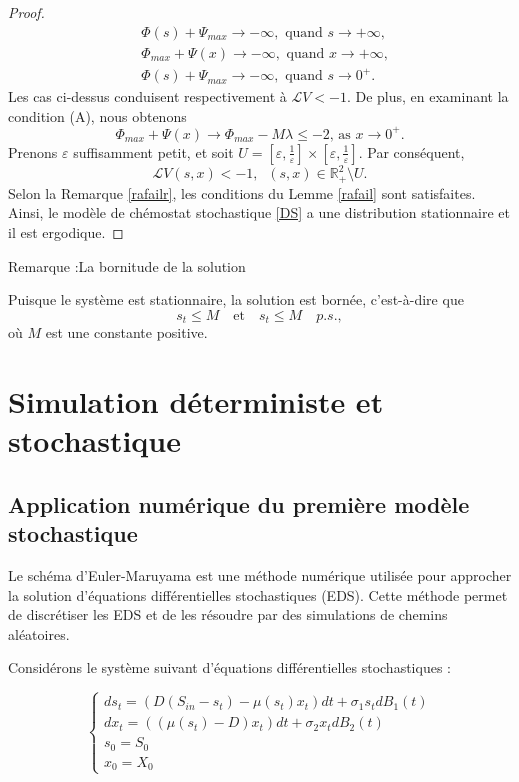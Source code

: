 \documentclass[12pt,a4paper]{report}%
\newcounter{remm}[chapter]
\newenvironment{remarque}[2][]
  {\refstepcounter{remm}
  \begin{bclogo}[
    couleur=white,
    arrondi=0.1,
    couleurBord=white,#1]{Remarque \theremm:#2}
  }
  {\end{bclogo}}
\begin{document}
\begin{proof}
$$\begin{aligned}
		& \Phi(s)+\Psi_{max} \rightarrow-\infty, \text { quand } s \rightarrow+\infty, \\
		& \Phi_{max}+\Psi(x) \rightarrow-\infty, \text { quand } x \rightarrow+\infty, \\
		& \Phi(s)+\Psi_{max} \rightarrow-\infty, \text { quand } s \rightarrow 0^{+} .
	\end{aligned}
	$$
	Les cas ci-dessus conduisent respectivement à \(\mathcal{L} V < -1\). De plus, en examinant la condition (A), nous obtenons
	$$
	\Phi_{max}+\Psi(x) \rightarrow \Phi_{max}-M \lambda \leq-2 \text {, as } x \rightarrow 0^{+} .
	$$
	Prenons \(\varepsilon\) suffisamment petit, et soit \( U = \left[\varepsilon, \frac{1}{\varepsilon}\right] \times \left[\varepsilon, \frac{1}{\varepsilon}\right] \). Par conséquent,
	$$
	\mathcal{L} V(s, x)<-1, \;\;(s, x) \in \mathbb{R}^2_+\setminus U .
	$$
	Selon la Remarque \ref{rafailr}, les conditions du Lemme \ref{rafail} sont satisfaites. Ainsi, le modèle de chémostat stochastique \eqref{DS} a une distribution stationnaire et il est ergodique.
\end{proof}
\begin{remarque}{La bornitude de la solution}
	Puisque le système est stationnaire, la solution est bornée, c'est-à-dire que 
	$$s_t \leqslant M  \quad \text{et} \quad s_t \leqslant M \quad p.s.,$$
	où \( M \) est une constante positive.
\end{remarque}



\chapter{Simulation déterministe et stochastique}
\section{Application numérique du première modèle stochastique}
Le schéma d'Euler-Maruyama est une méthode numérique utilisée pour approcher la solution d'équations différentielles stochastiques (EDS). Cette méthode permet de discrétiser les EDS et de les résoudre par des simulations de chemins aléatoires.

Considérons le système suivant d'équations différentielles stochastiques :

\begin{equation}\label{sigma}
	\begin{cases}
		ds_t = \left( D \left(S_{in} - s_t\right) - \mu(s_t)x_t \right) dt + \sigma_1 s_t dB_1(t) \\
		dx_t = \left( (\mu(s_t) - D) x_t \right) dt + \sigma_2 x_t dB_2(t) \\
		s_0 = S_0 \\
		x_0 = X_0
	\end{cases}
\end{equation}
\end{document}

